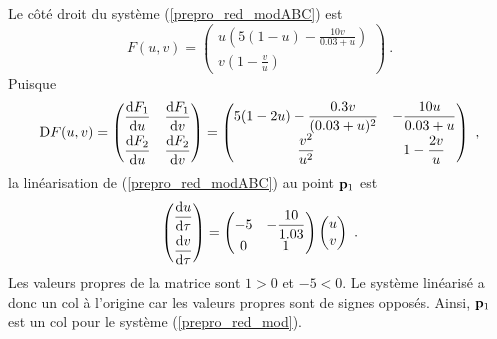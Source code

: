 {Le côté droit du système (\ref{prepro_red_modABC}) est
\[
  F(u,v) = \begin{pmatrix} 
\displaystyle  u \left( 5\left( 1 - u\right) - \frac{10 v}{0.03 + u} \right) \\
\displaystyle  v \left(1 - \frac{v}{u}\right)
  \end{pmatrix} \ .
\]
Puisque
\[
  \mathrm{D} F(u,v)
=
\begin{pmatrix}
  \displaystyle \frac{\mathrm{d}F_1}{\mathrm{d}u} & \displaystyle \frac{\mathrm{d}F_1}{\mathrm{d}v} \\[0.7em]
  \displaystyle \frac{\mathrm{d}F_2}{\mathrm{d}u} & \displaystyle \frac{\mathrm{d}F_2}{\mathrm{d}v}
\end{pmatrix} =
\begin{pmatrix}
\displaystyle 5(1-2u) - \frac{0.3 v}{(0.03+u)^2} &
\displaystyle - \frac{10 u}{0.03+ u} \\
\displaystyle \frac{v^2}{u^2} &
\displaystyle 1 - \frac{2v}{u}
\end{pmatrix} \ ,
\]
la linéarisation de (\ref{prepro_red_modABC}) au point $\mathbf{p}_1$ est
\[
\begin{pmatrix}
\displaystyle \frac{\mathrm{d}u}{\mathrm{d}\tau} \\[0.7em] \displaystyle \frac{\mathrm{d}v}{\mathrm{d}\tau}
\end{pmatrix} =
\begin{pmatrix}
\displaystyle -5 & \displaystyle - \frac{10}{1.03} \\
0 & 1
\end{pmatrix}
\begin{pmatrix}
u \\ v
\end{pmatrix} \ .
\]
Les valeurs propres de la matrice sont $1>0$ et $-5<0$.  Le système
linéarisé a donc un col à l'origine car les valeurs propres sont de signes
opposés.  Ainsi, $\mathbf{p}_1$ est un col pour le système
(\ref{prepro_red_mod}).

}
